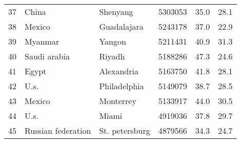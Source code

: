 \begin{center}
\begin{longtable}{clllcc}
        37                                       & China                                & Shenyang                          & 5303053                                 & 35.0                                  & 28.1                                  \\
        38                                       & Mexico                               & Guadalajara                       & 5243178                                 & 37.0                                  & 22.9                                  \\
        39                                       & Myanmar                              & Yangon                            & 5211431                                 & 40.9                                  & 31.3                                  \\
        40                                       & Saudi arabia                         & Riyadh                            & 5188286                                 & 47.3                                  & 24.6                                  \\
        41                                       & Egypt                                & Alexandria                        & 5163750                                 & 41.8                                  & 28.1                                  \\
        42                                       & U.s.                                 & Philadelphia                      & 5149079                                 & 38.7                                  & 28.5                                  \\
        43                                       & Mexico                               & Monterrey                         & 5133917                                 & 44.0                                  & 30.5                                  \\
        44                                       & U.s.                                 & Miami                             & 4919036                                 & 37.8                                  & 29.7                                  \\
        45                                       & Russian federation                   & St. petersburg                    & 4879566                                 & 34.3                                  & 24.7                                  \\

\end{longtable}
\end{center}
